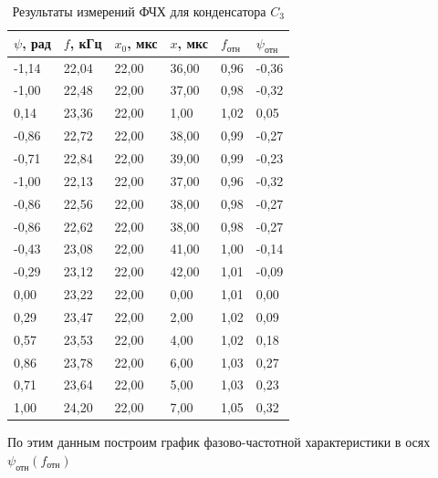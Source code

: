 \begin{table}[H]
    \centering
    \caption{Результаты измерений ФЧХ для конденсатора $C_3$}
    \begin{tabular}{|l|l|l|l|l|l|}
    \hline
        $\psi$, рад & $f$, кГц & $x_0$, мкс & $x$, мкс & $f_{\text{отн}}$ & $\psi_{\text{отн}}$ \\ \hline
        -1,14 & 22,04 & 22,00 & 36,00 & 0,96 & -0,36 \\ \hline
        -1,00 & 22,48 & 22,00 & 37,00 & 0,98 & -0,32 \\ \hline
        0,14 & 23,36 & 22,00 & 1,00 & 1,02 & 0,05 \\ \hline
        -0,86 & 22,72 & 22,00 & 38,00 & 0,99 & -0,27 \\ \hline
        -0,71 & 22,84 & 22,00 & 39,00 & 0,99 & -0,23 \\ \hline
        -1,00 & 22,13 & 22,00 & 37,00 & 0,96 & -0,32 \\ \hline
        -0,86 & 22,56 & 22,00 & 38,00 & 0,98 & -0,27 \\ \hline
        -0,86 & 22,62 & 22,00 & 38,00 & 0,98 & -0,27 \\ \hline
        -0,43 & 23,08 & 22,00 & 41,00 & 1,00 & -0,14 \\ \hline
        -0,29 & 23,12 & 22,00 & 42,00 & 1,01 & -0,09 \\ \hline
        0,00 & 23,22 & 22,00 & 0,00 & 1,01 & 0,00 \\ \hline
        0,29 & 23,47 & 22,00 & 2,00 & 1,02 & 0,09 \\ \hline
        0,57 & 23,53 & 22,00 & 4,00 & 1,02 & 0,18 \\ \hline
        0,86 & 23,78 & 22,00 & 6,00 & 1,03 & 0,27 \\ \hline
        0,71 & 23,64 & 22,00 & 5,00 & 1,03 & 0,23 \\ \hline
        1,00 & 24,20 & 22,00 & 7,00 & 1,05 & 0,32 \\ \hline
    \end{tabular}
\end{table}
По этим данным построим график фазово-частотной характеристики в осях $\psi_{\text{отн}}(f_{\text{отн}})$
